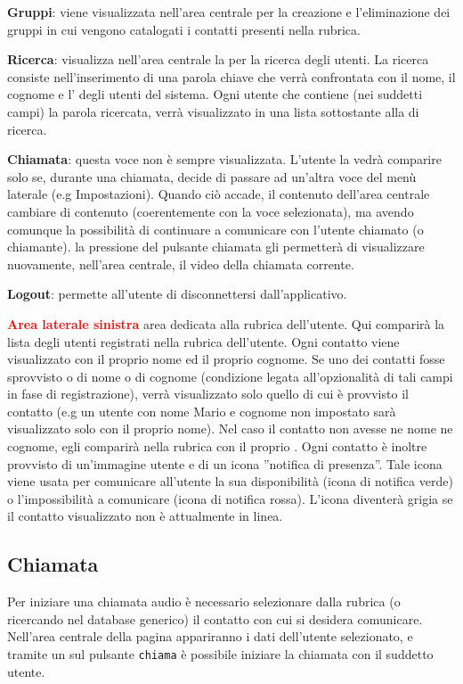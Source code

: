 \begin{description}
\begin{description}
\item \textbf{Gruppi}: viene visualizzata nell'area centrale  per la creazione e l'eliminazione dei gruppi in cui vengono catalogati i contatti presenti nella rubrica.
\item \textbf{Ricerca}: visualizza nell'area centrale la  per la ricerca degli utenti. La ricerca consiste nell'inserimento di una parola chiave che verrà confrontata con il nome, il cognome e l' degli utenti del sistema. Ogni utente che contiene (nei suddetti campi) la parola ricercata, verrà visualizzato in una lista sottostante alla  di ricerca.
\item \textbf{Chiamata}: questa voce non è sempre visualizzata. L'utente la vedrà comparire solo se, durante una chiamata, decide di passare ad un'altra voce del menù laterale (e.g Impostazioni). Quando ciò accade, il contenuto dell'area centrale cambiare di contenuto (coerentemente con la voce selezionata), ma avendo comunque la possibilità di continuare a comunicare con l'utente chiamato (o chiamante). la pressione del pulsante chiamata gli permetterà di visualizzare nuovamente, nell'area centrale, il video della chiamata corrente.
\item \textbf{Logout}: permette all'utente di disconnettersi dall'applicativo.
\end{description}
\item \textcolor{red}{\textbf{Area laterale sinistra}} area dedicata alla rubrica dell'utente. Qui comparirà la lista degli utenti registrati nella rubrica dell'utente. Ogni contatto viene visualizzato con il proprio nome ed il proprio cognome. Se uno dei contatti fosse sprovvisto o di nome o di cognome (condizione legata all'opzionalità di tali campi in fase di registrazione), verrà visualizzato solo quello di cui è provvisto il contatto (e.g un utente con nome Mario e cognome non impostato sarà visualizzato solo con il proprio nome). Nel caso il contatto non avesse ne nome ne cognome, egli comparirà nella rubrica con il proprio . Ogni contatto è inoltre provvisto di un'immagine utente e di un icona ''notifica di presenza''. Tale icona viene usata per comunicare all'utente la sua disponibilità (icona di notifica verde) o l'impossibilità a comunicare (icona di notifica rossa). L'icona diventerà grigia se il contatto visualizzato non è attualmente in linea.
\end{description}

\subsection{Chiamata}
Per iniziare una chiamata audio è necessario selezionare dalla rubrica (o ricercando nel database generico) il contatto con cui si desidera comunicare. Nell'area centrale della pagina appariranno i dati dell'utente selezionato, e tramite un  sul pulsante \texttt{chiama} è possibile iniziare la chiamata con il suddetto utente.


